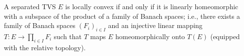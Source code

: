 A separated TVS $E$ is locally convex if and only if it is linearly homeomorphic with a subspace of the product of a family of Banach spaces; i.e., there exists a family of Banach spaces $(F_i)_{i \in I}$ and an injective linear mapping $T: E \to \prod_{i \in I} F_i$ such that $T$ maps $E$ homeomorphically onto $T(E)$ (equipped with the relative topology).
